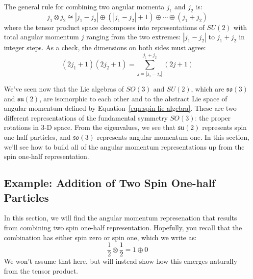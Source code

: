 \documentclass[12pt]{article}
\begin{document}
The general rule for combining two angular momenta $j_1$ and $j_2$ is:
\begin{equation*}
j_1 \otimes j_2 \cong |j_1 - j_2| \oplus (|j_1 - j_2| + 1) \oplus \cdots \oplus (j_1 + j_2)
\end{equation*}
where the tensor product space decomposes into 
representations of $SU(2)$ with total angular momentum $j$ ranging 
from the two extremes:  $|j_1 - j_2|$ to $j_1 + j_2$ in integer steps.  As a check, the 
dimensions on both sides must agree:
\begin{equation*}
(2j_1 + 1)(2j_2 + 1) = \sum_{j=|j_1-j_2|}^{j_1+j_2} (2j+1)
\end{equation*}

We've seen now that the Lie algebras of $SO(3)$ and $SU(2)$, which are
$\mathfrak{so}(3)$ and $\mathfrak{su}(2)$, are isomorphic to each
other and to the abstract Lie space of angular momentum defined by
Equation~\ref{eqn:spin-lie-algebra}.  These are two different
representations of the fundamental symmetry $SO(3)$: the proper
rotations in 3-D space.  From the eigenvalues, we see that
$\mathfrak{su}(2)$ represents spin one-half particles, and
$\mathfrak{so}(3)$ represents angular momentum one.  In this section,
we'll see how to build all of the angular momentum representations up
from the spin one-half representation.

\subsection*{Example:  Addition of Two Spin One-half Particles}

In this section, we will find the angular momentum represenation that results from combining two spin one-half representation.  Hopefully, you recall that the combination has either spin zero or spin one, which we write as:
$$\frac{1}{2} \otimes \frac{1}{2} = 1 \oplus 0$$
We won't assume that here, but will instead show how this emerges
naturally from the tensor product.
\end{document}
